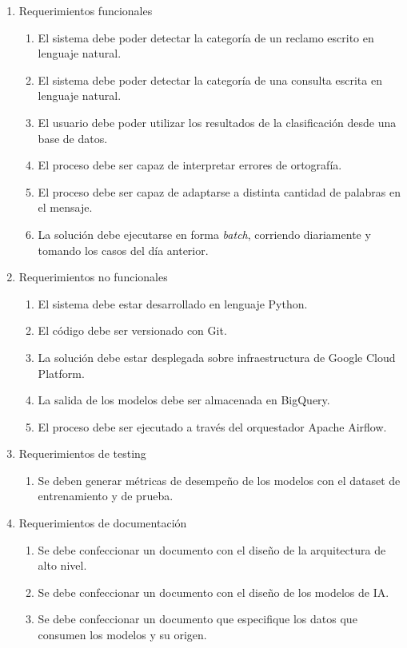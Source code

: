 \begin{enumerate}
	\item Requerimientos funcionales
	\begin{enumerate}
		\item El sistema debe poder detectar la categoría de un reclamo escrito en lenguaje natural.
		\item El sistema debe poder detectar la categoría de una consulta escrita en lenguaje natural.
		\item El usuario debe poder utilizar los resultados de la clasificación desde una base de datos.
		\item El proceso debe ser capaz de interpretar errores de ortografía.
		\item El proceso debe ser capaz de adaptarse a distinta cantidad de palabras en el mensaje.
		\item La solución debe ejecutarse en forma \textit{batch}, corriendo diariamente y tomando los casos del día anterior.
	\end{enumerate}
	\item Requerimientos no funcionales
	\begin{enumerate}
		\item El sistema debe estar desarrollado en lenguaje Python.
		\item El código debe ser versionado con Git.
		\item La solución debe estar desplegada sobre infraestructura de Google Cloud Platform.
		\item La salida de los modelos debe ser almacenada en BigQuery.
		\item El proceso debe ser ejecutado a través del orquestador Apache Airflow.
	\end{enumerate}
	\item Requerimientos de testing
	\begin{enumerate}
		\item Se deben generar métricas de desempeño de los modelos con el dataset de entrenamiento y de prueba.
	\end{enumerate}
	\item Requerimientos de documentación
	\begin{enumerate}
		\item Se debe confeccionar un documento con el diseño de la arquitectura de alto nivel.
		\item Se debe confeccionar un documento con el diseño de los modelos de IA.
		\item Se debe confeccionar un documento que especifique los datos que consumen los modelos y su origen.
	\end{enumerate}
\end{enumerate}



